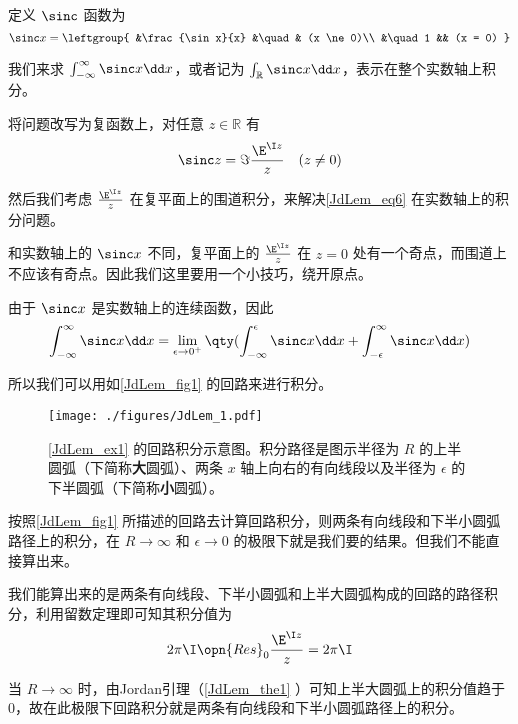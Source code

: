 \begin{example}{}\label{JdLem_ex1}

定义 $\sinc$ 函数为
\begin{equation}
\sinc x = 
\leftgroup{
&\frac{\sin x}{x} &\quad & (x \ne 0)\\
&\quad 1 && (x = 0)
}\end{equation}

我们来求 $\int_{-\infty}^{\infty}\sinc x\dd x$，或者记为 $\int_{\mathbb{R}}\sinc x \dd x$，表示在整个实数轴上积分。

将问题改写为复函数上，对任意 $z\in\mathbb{R}$ 有
\begin{equation}\label{JdLem_eq6}
\sinc z = \Im \frac{\E^{\I z}}{z} \quad  (z \ne 0)
\end{equation}

然后我们考虑 $\frac{\E^{\I z}}{z}$ 在复平面上的围道积分，来解决\autoref{JdLem_eq6} 在实数轴上的积分问题。

和实数轴上的 $\sinc x$ 不同，复平面上的 $\frac{\E^{\I z}}{z}$ 在 $z=0$ 处有一个奇点，而围道上不应该有奇点。因此我们这里要用一个小技巧，绕开原点。

由于 $\sinc x$ 是实数轴上的连续函数，因此
\begin{equation}
\int_{-\infty}^\infty \sinc x \dd x=\lim\limits_{\epsilon\to 0^+}\qty(\int_{-\infty}^\epsilon \sinc x \dd x+\int_{-\epsilon}^\infty \sinc x \dd x)
\end{equation}

所以我们可以用如\autoref{JdLem_fig1} 的回路来进行积分。

\begin{figure}[ht]
\centering
\texttt{[image: ./figures/JdLem\_1.pdf]}
\caption{\autoref{JdLem_ex1} 的回路积分示意图。积分路径是图示半径为 $R$ 的上半圆弧（下简称\textbf{大}圆弧）、两条 $x$ 轴上向右的有向线段以及半径为 $\epsilon$ 的下半圆弧（下简称\textbf{小}圆弧）。} \label{JdLem_fig1}
\end{figure}

按照\autoref{JdLem_fig1} 所描述的回路去计算回路积分，则两条有向线段和下半小圆弧路径上的积分，在 $R\to\infty$ 和 $\epsilon\to 0$ 的极限下就是我们要的结果。但我们不能直接算出来。

我们能算出来的是两条有向线段、下半小圆弧和上半大圆弧构成的回路的路径积分，利用留数定理即可知其积分值为
\begin{equation}\label{JdLem_eq7}
2\pi\I\opn{Res}_0\frac{\E^{\I z}}{z}=2\pi\I
\end{equation}

当 $R\to \infty$ 时，由Jordan引理（\autoref{JdLem_the1} ）可知上半大圆弧上的积分值趋于 $0$，故在此极限下回路积分就是两条有向线段和下半小圆弧路径上的积分。


\end{example}
